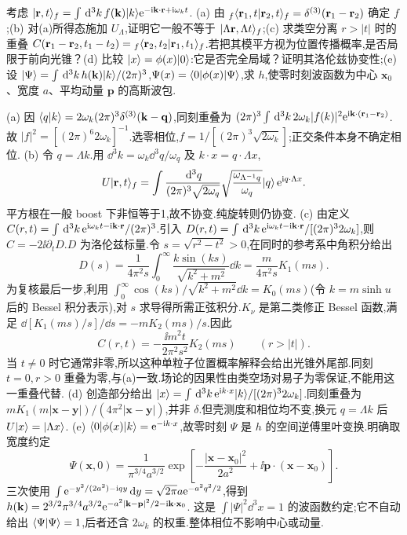 \begin{exercise}
考虑 $\lvert \mathbf r,t\rangle_f=\int\,\mathrm d^3k\,f(\mathbf k)\lvert k\rangle\mathrm e^{-\mathrm i\mathbf k\cdot\mathbf r+\mathrm i\omega_k t}$.
(a) 由 ${}_f\langle \mathbf r_1,t\rvert\mathbf r_2,t\rangle_f=\delta^{(3)}(\mathbf r_1-\mathbf r_2)$ 确定 $f$;(b) 对(a)所得态施加 $U_\Lambda$,证明它一般不等于 $\lvert \Lambda\mathbf r,\Lambda t\rangle_f$;(c) 求类空分离 $r>|t|$ 时的重叠 $C(\mathbf r_1-\mathbf r_2,t_1-t_2)={}_f\langle \mathbf r_2,t_2\rvert\mathbf r_1,t_1\rangle_f$.若把其模平方视为位置传播概率,是否局限于前向光锥？(d) 比较 $\lvert x\rangle=\phi(x)\lvert 0\rangle$:它是否完全局域？证明其洛伦兹协变性;(e) 设 $\lvert \Psi\rangle=\int\,\mathrm d^3k\,h(\mathbf k)\lvert k\rangle/(2\pi)^3$,$\Psi(x)=\langle 0\rvert\phi(x)\lvert \Psi\rangle$,求 $h$,使零时刻波函数为中心 $\mathbf x_0$、宽度 $a$、平均动量 $\mathbf p$ 的高斯波包.
\end{exercise}
\begin{solution}
(a) 因 $\langle q\vert k\rangle=2\omega_k(2\pi)^3\delta^{(3)}(\mathbf k-\mathbf q)$,同刻重叠为
$(2\pi)^3\int\,\mathrm d^3k\,2\omega_k|f(k)|^2\mathrm e^{\mathrm i\mathbf k\cdot(\mathbf r_1-\mathbf r_2)}$.故 $|f|^2=[(2\pi)^6 2\omega_k]^{-1}$.选零相位,$f=1/[(2\pi)^3\sqrt{2\omega_k}]$;正交条件本身不确定相位.
(b) 令 $q=\Lambda k$.用 $\dd^3k=\omega_k\dd^3q/\omega_q$ 及 $k\cdot x=q\cdot\Lambda x$,
\[
U\lvert \mathbf r,t\rangle_f=\int\frac{\,\mathrm d^3q}{(2\pi)^3\sqrt{2\omega_q}}
\sqrt{\frac{\omega_{\Lambda^{-1}q}}{\omega_q}}\lvert q\rangle\,\mathrm e^{\mathrm i q\cdot\Lambda x}.
\]
平方根在一般 boost 下非恒等于1,故不协变.纯旋转则仍协变.
(c) 由定义 $C(r,t)=\int\,\mathrm d^3k\,\mathrm e^{\mathrm i\omega_k t-\mathrm i\mathbf k\cdot\mathbf r}/(2\pi)^3$.引入
$D(r,t)=\int\,\mathrm d^3k\,\mathrm e^{\mathrm i\omega_k t-\mathrm i\mathbf k\cdot\mathbf r}/[(2\pi)^3 2\omega_k]$,则 $C=-2\ii\partial_tD$.$D$ 为洛伦兹标量.令 $s=\sqrt{r^2-t^2}>0$,在同时的参考系中角积分给出
\[
D(s)=\frac1{4\pi^2s}\int_0^\infty\frac{k\sin(ks)}{\sqrt{k^2+m^2}}\dd k
=\frac{m}{4\pi^2s}K_1(ms).
\]
为复核最后一步,利用 $\int_0^\infty\cos(ks)/\sqrt{k^2+m^2}\dd k=K_0(ms)$(令 $k=m\sinh u$ 后的 Bessel 积分表示),对 $s$ 求导得所需正弦积分.$K_\nu$ 是第二类修正 Bessel 函数,满足 $\dd[K_1(ms)/s]/\dd s=-mK_2(ms)/s$.因此
\[
C(r,t)=-\frac{\ii m^2t}{2\pi^2s^2}K_2(ms)\qquad(r>|t|).
\]
当 $t\ne0$ 时它通常非零,所以这种单粒子位置概率解释会给出光锥外尾部.同刻 $t=0,r>0$ 重叠为零,与(a)一致.场论的因果性由类空场对易子为零保证,不能用这一重叠代替.
(d) 创造部分给出 $\lvert x\rangle=\int\,\mathrm d^3k\,\mathrm e^{\mathrm i k\cdot x}\lvert k\rangle/[(2\pi)^3 2\omega_k]$.同刻重叠为 $mK_1(m|\mathbf x-\mathbf y|)/(4\pi^2|\mathbf x-\mathbf y|)$,并非 $\delta$.但壳测度和相位均不变,换元 $q=\Lambda k$ 后 $U\lvert x\rangle=\lvert \Lambda x\rangle$.
(e) $\langle 0\rvert\phi(x)\lvert k\rangle=\mathrm e^{-\mathrm i k\cdot x}$,故零时刻 $\Psi$ 是 $h$ 的空间逆傅里叶变换.明确取宽度约定
\[
\Psi(\mathbf x,0)=\frac{1}{\pi^{3/4}a^{3/2}}\exp\left[-\frac{|\mathbf x-\mathbf x_0|^2}{2a^2}+\ii\mathbf p\cdot(\mathbf x-\mathbf x_0)\right].
\]
三次使用 $\int\mathrm e^{-y^2/(2a^2)-\mathrm i qy}\,\mathrm d y=\sqrt{2\pi}a\mathrm e^{-a^2q^2/2}$,得到
$h(\mathbf k)=2^{3/2}\pi^{3/4}a^{3/2}\mathrm e^{-a^2|\mathbf k-\mathbf p|^2/2-\mathrm i\mathbf k\cdot\mathbf x_0}$.
这是 $\int|\Psi|^2\dd^3x=1$ 的波函数约定;它不自动给出 $\langle \Psi\vert \Psi\rangle=1$,后者还含 $2\omega_k$ 的权重.整体相位不影响中心或动量.
\end{solution}

